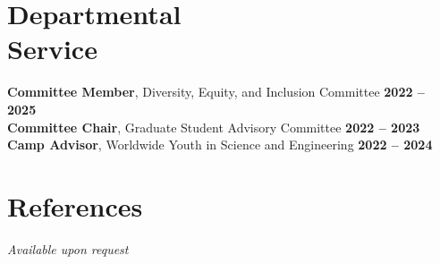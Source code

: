 \documentclass[margin,line]{resume}
\begin{document}
\begin{resume}
    \section{\mysidestyle Departmental\\Service}
                \textbf{Committee Member}, Diversity, Equity, and Inclusion Committee \hfill \textbf{2022 -- 2025}\vspace{.5mm}\\%
                \textbf{Committee Chair}, Graduate Student Advisory Committee \hfill \textbf{2022 -- 2023}\vspace{.5mm}\\%
                \textbf{Camp Advisor}, Worldwide Youth in Science and Engineering \hfill \textbf{2022 -- 2024}\vspace{.5mm}\\%






\section{\mysidestyle References}
\textit{Available upon request}



\end{resume}
\end{document}

